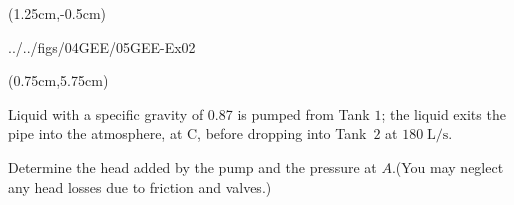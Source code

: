 \documentclass[9pt,xcolor={svgnames, x11names},professionalfonts, mathserif]{beamer}
\begin{document}
\begin{frame}
	\begin{textblock*}{1\textwidth}(1.25cm,-0.5cm)
		\begin{cfig}[0.35]{../../figs/04GEE/05GEE-Ex02}\end{cfig}
	\end{textblock*}
	\begin{textblock*}{1.05\textwidth}(0.75cm,5.75cm)
		\centering
		\begin{myexam}[colframe=example, colbacktitle=example!80!white, width=0.85\textwidth]{}{}
			\raggedright
			Liquid with a specific gravity of 0.87 is pumped from Tank $1$; the liquid exits the pipe into the atmosphere, at C, before dropping into Tank~$2$ at
			$180\;\text{L/s}$.\par\medskip Determine the head added by the pump and the
			pressure at $A$.\lb (You may neglect any head losses due to friction and valves.)
		\end{myexam}
		
	\end{textblock*}
\end{frame}

\end{document}
